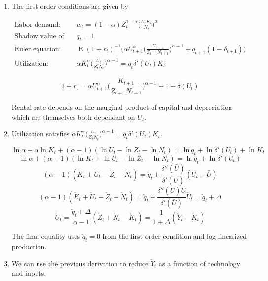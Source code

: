 \documentclass[11pt]{article}
\DeclareMathOperator{\ev}{E}
\begin{document}
    \begin{enumerate}

        \item The first order conditions are given by

            \begin{align*}
                \text{Labor demand:~} & w_t = (1-\alpha) Z_t^{1-\alpha} \bigg ( \frac{U_t K_t}{N_t} \bigg )^\alpha \\
                \text{Shadow value of capital:~} & q_t = 1 \\
                \text{Euler equation:~} & \ev (1+r_t)^{-1} \bigg ( \alpha U_{t+1}^\alpha \bigg ( \frac{K_{t+1}}{Z_{t+1} N_{t+1}} \bigg )^{\alpha-1} + q_{t+1} (1-\delta_{t+1}) \bigg ) \\
                \text{Utilization:~} & \alpha K_t^\alpha \bigg ( \frac{U_t}{Z_t N_t} \bigg )^{\alpha-1} = q_t \delta'(U_t) K_t
            \end{align*}

            $$ 1 + r_t = \alpha U_{t+1}^\alpha \bigg ( \frac{K_{t+1}}{Z_{t+1} N_{t+1}} \bigg )^{\alpha-1} + 1 - \delta(U_t) $$

        Rental rate depends on the marginal product of capital and depreciation which are themselves both dependant on $U_t$.

        \item Utilization satisfies $\alpha K_t^\alpha \big ( \frac{U_t}{Z_t N_t} \big )^{\alpha-1} = q_t \delta'(U_t) K_t$.

            $$ \ln \alpha + \alpha \ln K_t + (\alpha - 1) (\ln U_t - \ln Z_t - \ln N_t) = \ln q_t + \ln \delta'(U_t) + \ln K_t $$
            $$ \ln \alpha + (\alpha - 1) (\ln K_t + \ln U_t - \ln Z_t - \ln N_t) = \ln q_t + \ln \delta'(U_t) $$
            $$ (\alpha - 1) (\check K_t + \check U_t - \check Z_t - \check N_t) = \check q_t + \frac{\delta''(\bar U)}{\delta'(\bar U)} (U_t - \bar U) $$
            $$ (\alpha - 1) (\check K_t + \check U_t - \check Z_t - \check N_t) = \check q_t + \frac{\delta''(\bar U) \bar U}{\delta'(\bar U)} \check U_t = \check q_t + \Delta $$
            $$ \check U_t = \frac{\check q_t + \Delta}{\alpha - 1} (\check Z_t + \check N_t - \check K_t) = \frac{1}{1+\Delta} (\check Y_t - \check K_t) $$

        The final equality uses $\check q_t = 0$ from the first order condition and log linearized production.

        \item We can use the previous derivation to reduce $\check Y_t$ as a function of technology and inputs.


\end{enumerate}
\end{document}
